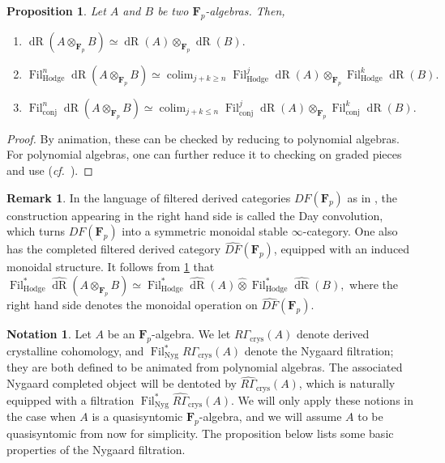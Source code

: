 \documentclass[10pt,letterpaper]{amsart}
\numberwithin{figure}{section}
\numberwithin{equation}{section}
\newtheorem{proposition}[figure]{Proposition}
\theoremstyle{definition}
\newtheorem{notation}[figure]{Notation}
\theoremstyle{definition}
\newtheorem{remark}[figure]{Remark}
\theoremstyle{definition}
\theoremstyle{definition}
\DeclareMathOperator*{\colim}{colim}
\DeclareMathOperator{\crys}{crys}
\DeclareMathOperator{\conj}{conj}
\DeclareMathOperator{\Hodge}{Hodge}
\DeclareMathOperator{\Fil}{Fil}
\DeclareMathOperator{\dR}{dR}
\newcommand{\F}{\mathbf{F}}
\begin{document}
\begin{proposition}\label{convv}
 Let $A$ and $B$ be two $\F_p$-algebras. Then,
\begin{enumerate}
    \item $\dR(A \otimes_{\F_p} B) \simeq \dR(A) \otimes_{\F_p} \dR(B).$

\item $\Fil^n_{\Hodge}\dR(A \otimes_{\F_p} B) \simeq \colim_{j+k \ge n} \Fil^{j}_{\Hodge} \dR(A) \otimes_{\F _p} \Fil^{k}_{\Hodge} \dR(B).$

\item $\Fil^n_{\conj}\dR(A \otimes_{\F_p} B) \simeq \colim_{j+k \le n} \Fil^{j}_{\conj} \dR(A) \otimes_{\F _p} \Fil^{k}_{\conj} \dR(B).$
\end{enumerate}{}
\end{proposition}{}
\begin{proof}
    By animation, these can be checked by reducing to polynomial algebras. For polynomial algebras, one can further reduce it to checking on graded pieces and use \cite[Lem.~5.2]{BMS2} (\textit{cf.}~\cite{fild}).
\end{proof}{}

\begin{remark}
In the language of filtered derived categories $DF(\F_p)$ as in \cite{BMS2}, the construction appearing in the right hand side is called the Day convolution, which turns $DF(\F_p)$ into a symmetric monoidal stable $\infty$-category. One also has the completed filtered derived category $\widehat{DF}(\F_p)$, equipped with an induced monoidal structure. It follows from \cref{convv} that $\Fil^*_{\Hodge}\widehat{\dR}(A \otimes_{\F_p} B) \simeq \Fil^*_{\Hodge}\widehat{\dR}(A) \hat{\otimes} \Fil^*_{\Hodge}\widehat{\dR}(B),$ where the right hand side denotes the monoidal operation on $\widehat{DF}(\F_p).$
\end{remark}{}
\begin{notation}
Let $A$ be an $\F_p$-algebra. We let $R\Gamma_{\crys}(A)$ denote derived crystalline cohomology, and $\Fil^*_{\mathrm{Nyg}} R\Gamma_{\crys}(A)$ denote the Nygaard filtration; they are both defined to be animated from polynomial algebras. The associated Nygaard completed object will be dentoted by $\widehat{R\Gamma}_{\crys} (A)$, which is naturally equipped with a filtration $\Fil^*_{\mathrm{Nyg}} \widehat{R\Gamma}_{\crys} (A).$ We will only apply these notions in the case when $A$ is a quasisyntomic $\F_p$-algebra, and we will assume $A$ to be quasisyntomic from now for simplicity. The proposition below lists some basic properties of the Nygaard filtration.
\end{notation}{}
\end{document}
